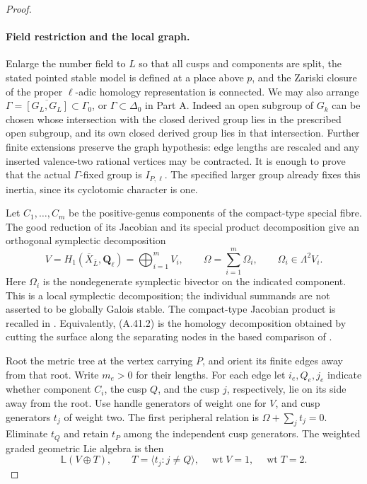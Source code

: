 \begin{proof}
\paragraph{Field restriction and the local graph.}
Enlarge the number field to \(L\) so that all cusps and
components are split, the stated pointed stable model is
defined at a place above \(p\), and the Zariski closure of
the proper \(\ell\)-adic homology representation is
connected. We may also arrange
\(\Gamma=\overline{[G_L,G_L]}\subset\Gamma_0\), or
\(\Gamma\subset\Delta_0\) in Part A. Indeed an open
subgroup of \(G_k\) can be chosen whose intersection
with the closed derived group lies in the prescribed open
subgroup, and its own closed derived group lies in that
intersection. Further finite extensions preserve the graph
hypothesis: edge lengths are rescaled and any inserted
valence-two rational vertices may be contracted. It is
enough to prove that the actual \(\Gamma\)-fixed group
is \(I_{P,\ell}\). The specified larger group already
fixes this inertia, since its cyclotomic character is one.

Let \(C_1,\ldots,C_m\) be the positive-genus components
of the compact-type special fibre. The good reduction of
its Jacobian and its special product decomposition give
an orthogonal symplectic decomposition
\[
 V=H_1(\overline X_{\bar L},\mathbf Q_\ell)
          =\bigoplus_{i=1}^m V_i,
 \qquad \Omega=\sum_{i=1}^m\Omega_i,
 \qquad \Omega_i\in\Lambda^2V_i.                    \tag{A.41.2}
\]
Here \(\Omega_i\) is the nondegenerate symplectic
bivector on the indicated component. This is a local
symplectic decomposition; the individual summands are not
asserted to be globally Galois stable. The compact-type
Jacobian product is recalled in
\cite[Section 1, p.1]{fghDupuyRabinoff}. Equivalently,
(A.41.2) is the homology decomposition obtained by cutting
the surface along the separating nodes in the based
comparison of \cite[Theorem 3.1.6]{fghBettsDogra}.

Root the metric tree at the vertex carrying \(P\), and
orient its finite edges away from that root. Write
\(m_e>0\) for their lengths. For each edge let
\(i_e,Q_e,j_e\) indicate whether component \(C_i\),
the cusp \(Q\), and the cusp \(j\), respectively,
lie on its side away from the root. Use handle generators
of weight one for \(V\), and cusp generators \(t_j\)
of weight two. The first peripheral relation is
\(\Omega+\sum_j t_j=0\). Eliminate \(t_Q\) and
retain \(t_P\) among the independent cusp generators.
The weighted graded geometric Lie algebra is then
\[
                         \mathbb L(V\oplus T),
 \qquad T=\langle t_j:j\ne Q\rangle,
 \quad \operatorname{wt}V=1,\quad\operatorname{wt}T=2.
                                                               \tag{A.41.3}
\]


\end{proof}
